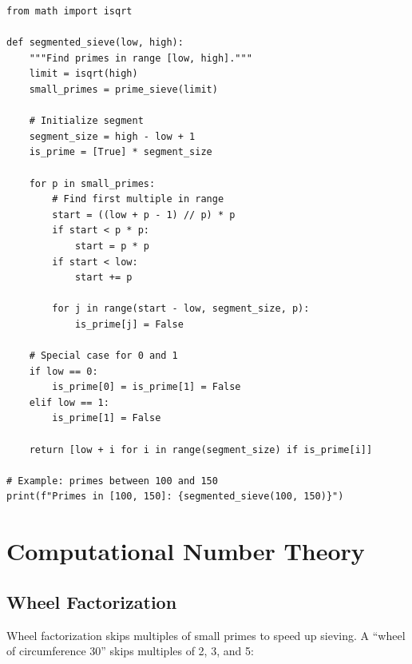 \begin{lstlisting}[caption={Segmented sieve}, label=lst:segmented_sieve]
from math import isqrt

def segmented_sieve(low, high):
    """Find primes in range [low, high]."""
    limit = isqrt(high)
    small_primes = prime_sieve(limit)
    
    # Initialize segment
    segment_size = high - low + 1
    is_prime = [True] * segment_size
    
    for p in small_primes:
        # Find first multiple in range
        start = ((low + p - 1) // p) * p
        if start < p * p:
            start = p * p
        if start < low:
            start += p
        
        for j in range(start - low, segment_size, p):
            is_prime[j] = False
    
    # Special case for 0 and 1
    if low == 0:
        is_prime[0] = is_prime[1] = False
    elif low == 1:
        is_prime[1] = False
    
    return [low + i for i in range(segment_size) if is_prime[i]]

# Example: primes between 100 and 150
print(f"Primes in [100, 150]: {segmented_sieve(100, 150)}")
\end{lstlisting}

\section{Computational Number Theory}

\subsection{Wheel Factorization}

Wheel factorization skips multiples of small primes to speed up sieving.
A ``wheel of circumference 30'' skips multiples of 2, 3, and 5:

